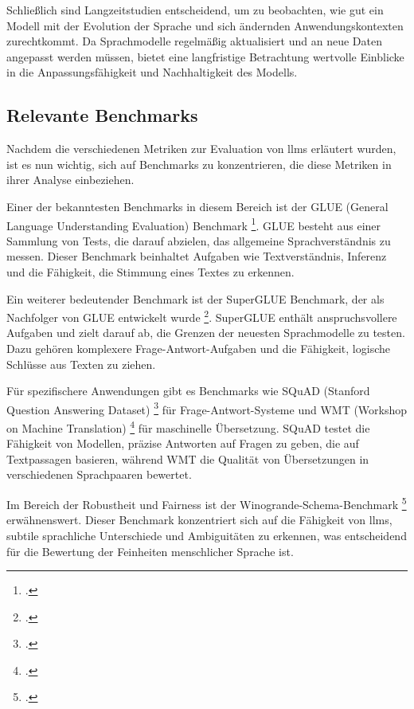 Schließlich sind Langzeitstudien entscheidend, um zu beobachten, wie gut ein Modell mit der Evolution der Sprache und sich ändernden Anwendungskontexten zurechtkommt. Da Sprachmodelle regelmäßig aktualisiert und an neue Daten angepasst werden müssen, bietet eine langfristige Betrachtung wertvolle Einblicke in die Anpassungsfähigkeit und Nachhaltigkeit des Modells.

\subsection{Relevante Benchmarks} \label{sec:exbenchmarks}
Nachdem die verschiedenen Metriken zur Evaluation von \acp{llm} erläutert wurden, ist es nun wichtig, sich auf Benchmarks zu konzentrieren, die diese Metriken in ihrer Analyse einbeziehen.

Einer der bekanntesten Benchmarks in diesem Bereich ist der GLUE (General Language Understanding Evaluation) Benchmark \footcite[Vgl.][S. 1]{wang2019glue}.
GLUE besteht aus einer Sammlung von Tests, die darauf abzielen, das allgemeine Sprachverständnis zu messen.
Dieser Benchmark beinhaltet Aufgaben wie Textverständnis, Inferenz und die Fähigkeit, die Stimmung eines Textes zu erkennen.

Ein weiterer bedeutender Benchmark ist der SuperGLUE Benchmark, der als Nachfolger von GLUE entwickelt wurde \footcite[Vgl.][S. 1]{sarlin2020superglue}.
SuperGLUE enthält anspruchsvollere Aufgaben und zielt darauf ab, die Grenzen der neuesten Sprachmodelle zu testen. Dazu gehören komplexere Frage-Antwort-Aufgaben und die Fähigkeit, logische Schlüsse aus Texten zu ziehen.

Für spezifischere Anwendungen gibt es Benchmarks wie SQuAD (Stanford Question Answering Dataset) \footcite[Vgl.][S. 1]{rajpurkar2016squad} für Frage-Antwort-Systeme und WMT (Workshop on Machine Translation) \footcite[Vgl.][S. 1]{birch2018findings} für maschinelle Übersetzung.
SQuAD testet die Fähigkeit von Modellen, präzise Antworten auf Fragen zu geben, die auf Textpassagen basieren, während WMT die Qualität von Übersetzungen in verschiedenen Sprachpaaren bewertet.

Im Bereich der Robustheit und Fairness ist der Winogrande-Schema-Benchmark \footcite[Vgl.][S. 1]{sakaguchi2019winogrande} erwähnenswert. Dieser Benchmark konzentriert sich auf die Fähigkeit von \acp{llm}, subtile sprachliche Unterschiede und Ambiguitäten zu erkennen, was entscheidend für die Bewertung der Feinheiten menschlicher Sprache ist.



